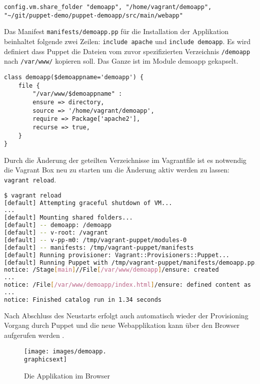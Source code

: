 \documentclass[12pt,a4paper,ngerman]{article}
\begin{document}
\begin{lstlisting}[language=vagrant,caption=Shared folders in Vagrantfile konfigurieren, label=sharedfolders]
config.vm.share_folder "demoapp", "/home/vagrant/demoapp", "~/git/puppet-demo/puppet-demoapp/src/main/webapp"
\end{lstlisting}

Das Manifest \lstinline$manifests/demoapp.pp$ für die Installation der Applikation beinhaltet folgende zwei Zeilen: \lstinline[language=puppet]$include apache$ und  \lstinline[language=puppet]$include demoapp$. Es wird definiert dass Puppet die Dateien vom zuvor spezifizierten Verzeichnis \lstinline$/demoapp$ nach \lstinline$/var/www/$ kopieren soll. Das Ganze ist im Module demoapp gekapselt.

\begin{lstlisting}[language=puppet,caption=Puppet Module demoapp,label=puppet-demo-module]
class demoapp($demoappname='demoapp') {
    file {
        "/var/www/$demoappname" :
        ensure => directory,
        source => '/home/vagrant/demoapp',
        require => Package['apache2'],
        recurse => true,
    }
}
\end{lstlisting}


Durch die Änderung der geteilten Verzeichnisse im Vagrantfile ist es notwendig die Vagrant Box neu zu starten um die Änderung aktiv werden zu lassen:  \lstinline$vagrant reload$.
\begin{lstlisting}[language=sh,caption=Puppet reload mit Provisioning der Applikation, label=reloaddemoapp]
$ vagrant reload
[default] Attempting graceful shutdown of VM...
...
[default] Mounting shared folders...
[default] -- demoapp: /demoapp
[default] -- v-root: /vagrant
[default] -- v-pp-m0: /tmp/vagrant-puppet/modules-0
[default] -- manifests: /tmp/vagrant-puppet/manifests
[default] Running provisioner: Vagrant::Provisioners::Puppet...
[default] Running Puppet with /tmp/vagrant-puppet/manifests/demoapp.pp...
notice: /Stage[main]//File[/var/www/demoapp]/ensure: created
...
notice: /File[/var/www/demoapp/index.html]/ensure: defined content as '{md5}90a8d419b9c7b43b09ba73abebaf8f4c'
...
notice: Finished catalog run in 1.34 seconds
\end{lstlisting}

Nach Abschluss des Neustarts erfolgt auch automatisch wieder der Provisioning Vorgang durch Puppet und die neue Webapplikation kann über den Browser aufgerufen werden .
\begin{figure}
  \begin{center}
    \texttt{[image: images/demoapp.\\graphicsext]}
  \end{center}
  \caption{Die Applikation im Browser}
  \label{demoapp}
\end{figure}
\end{document}
